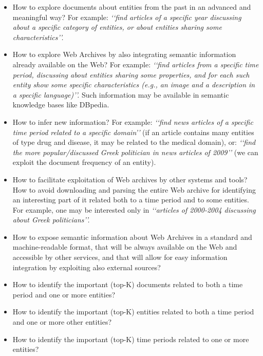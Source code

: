 \documentclass[runningheads,a4paper]{libtex/llncs}
\newcommand{\q}[1]{\lq\lq{}{}#1\rq\rq{}{}}
\begin{document}
\begin{itemize}
\item   How to explore documents about entities from the past in an advanced and meaningful way?
        For example: {\em \q{find articles of a specific year discussing about a specific category of
        entities, or about entities sharing some characteristics}.}
\item   How to explore Web Archives by also integrating
        semantic information already available on the Web?
        For example: {\em \q{find articles from a specific time period, discussing about
        entities sharing some properties, and for each such entity
        show some specific characteristics (e.g., an image and a description in a specific language)}.}
        Such information may be available in semantic knowledge bases like DBpedia.
\item   How to infer new information?
        For example:
        {\em \q{find news articles of a specific time period related to a specific domain}}
        (if an article contains many entities of type drug and disease, it may be related to the
        medical domain), or:
        {\em \q{find the more popular/discussed Greek politician in news articles of 2009}}
        (we can exploit the document frequency of an entity).
\item   How to facilitate exploitation of Web archives by other systems and tools?
        How to avoid downloading and parsing the entire Web archive for
        identifying an interesting part of it related both to a time period
        and to some entities. For example, one may be interested only
        in {\em \q{articles of 2000-2004 discussing about Greek politicians}.}
\item   How to expose semantic information about Web Archives in a standard and machine-readable
        format, that will be always available on the Web and accessible by other services,
        and that will allow for easy information integration by exploiting also external sources?
\item   How to identify the important (top-K) documents related to both a time period and one or more
        entities?
\item   How to identify the important (top-K) entities related to both a time period and one or more other
        entities?
\item   How to identify the important (top-K) time periods related to one or more entities?
\end{itemize}
\end{document}
